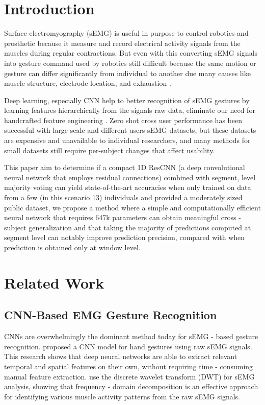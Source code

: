 \documentclass[article,submit,pdftex,moreauthors]{Definitions/mdpi}
\begin{document}

\section{Introduction}

Surface electromyography (sEMG) is useful in purpose to control robotics and prosthetic because it measure and record electrical activity signals from the muscles during regular contractions. But even with this converting sEMG signals into gesture command used by robotics still difficult because the same motion or gesture can differ significantly from individual to another due many causes like muscle structure, electrode location, and exhaustion \citep{zou2021transfer}.

Deep learning, especially CNN help to better recognition of sEMG gestures by learning features hierarchically from the signals raw data, eliminate our need for handcrafted feature engineering \citep{Li2021gesture}. Zero shot cross user performance has been successful with large scale and different users sEMG datasets, but these datasets are expensive and unavailable to individual researchers, and many methods for small datasets still require per-subject changes that affect usability\citep{eddy2024big}.


This paper aim to determine if a compact 1D ResCNN (a deep convolutional neural network that employs residual connections) combined with segment, level majority voting can yield state-of-the-art accuracies when only trained on data from a few (in this scenario 13) individuals and provided a moderately sized public dataset, we propose a method where a simple and computationally efficient neural network that requires 647k  parameters can obtain meaningful cross - subject generalization and that taking the majority of predictions computed at segment level can notably improve prediction precision, compared with when prediction is obtained only at window level.

\section{Related Work}

\subsection{CNN-Based EMG Gesture Recognition}

CNNs are overwhelmingly the dominant method today for sEMG - based gesture recognition. \cite{bo2021hand} proposed a CNN model for hand gestures using raw sEMG signals. This research shows that deep neural networks are able to extract relevant temporal and spatial features on their own, without requiring time - consuming manual feature extraction. \cite{morozumi2021fundamental} use the discrete wavelet transform (DWT) for sEMG analysis, showing that frequency - domain decomposition is an effective approach for identifying various muscle activity patterns from the raw sEMG signals.
\end{document}

